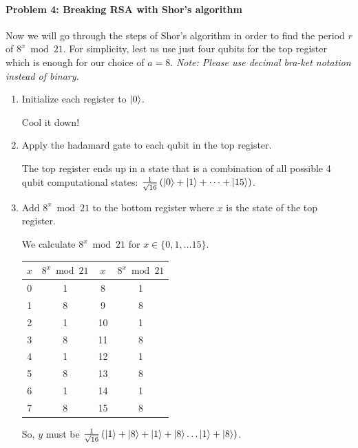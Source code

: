 \documentclass[12pt]{article}
\newcommand{\rsqrt}[1]{\ensuremath{\frac{1}{\sqrt{#1}}}}
\newenvironment{answer}{\begingroup\setlength{\leftskip}{-\leftmargin}\begin{framed}}{\end{framed}\endgroup}
\begin{document}
\paragraph{Problem 4: Breaking RSA with Shor's algorithm} \hfill

Now we will go through the steps of Shor's algorithm in order to find the period $r$ of $8^x\bmod21$. For simplicity, lest us use just four qubits for the top register which is enough for our choice of $a = 8$.
\emph{Note: Please use decimal bra-ket notation instead of binary. }

\begin{enumerate}
    \item Initialize each register to $\ket{0}$.

    \begin{answer}
    	Cool it down!
    \end{answer}

    \item Apply the hadamard gate to each qubit in the top register.

    \begin{answer}
    	The top register ends up in a state that is a combination of all possible 4 qubit computational states: $\rsqrt{16}\left(\ket{0} + \ket{1} + \dots + \ket{15}\right)$.
    \end{answer}

    \item Add $8^x\bmod21$ to the bottom register where $x$ is the state of the top register.

    \begin{answer}
    	We calculate $8^x\bmod21$ for $x \in \{0, 1, \dots 15\}$.

    	\begin{tabular}{c|c||c|c}
    		$x$ & $8^x\bmod21$ & $x$ & $8^x\bmod21$ \\
    		\hline
    		0 & 1 & 8 & 1 \\
    		1 & 8 & 9 & 8 \\
    		2 & 1 & 10 & 1 \\
    		3 & 8 & 11 & 8 \\
    		4 & 1 & 12 & 1 \\
    		5 & 8 & 13 & 8 \\
    		6 & 1 & 14 & 1 \\
    		7 & 8 & 15 & 8 \\
    	\end{tabular}

    	So, $y$ must be $\rsqrt{16}\left(\ket{1} + \ket{8} + \ket{1} + \ket{8} \dots \ket{1} + \ket{8}\right)$.
    \end{answer}


\end{enumerate}
\end{document}
